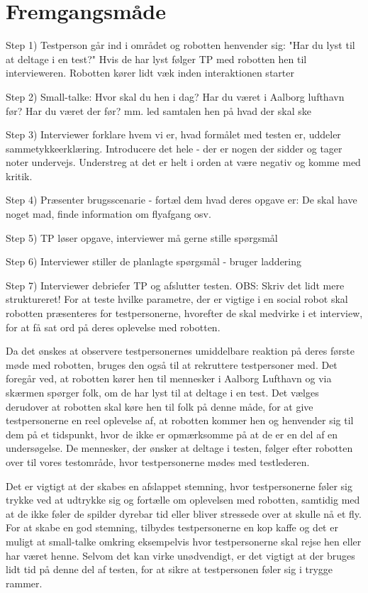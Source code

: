 \section{Fremgangsmåde}
\label{ParametreFremgangsmaade}
%
Step 1) Testperson går ind i området og robotten henvender sig: "Har du lyst til at deltage i en test?" Hvis de har lyst følger TP med robotten hen til intervieweren. Robotten kører lidt væk inden interaktionen starter

Step 2) Small-talke: Hvor skal du hen i dag? Har du været i Aalborg lufthavn før? Har du været der før? mm. led samtalen hen på hvad der skal ske

Step 3) Interviewer forklare hvem vi er, hvad formålet med testen er, uddeler sammetykkeerklæring. Introducere det hele - der er nogen der sidder og tager noter undervejs. Understreg at det er helt i orden at være negativ og komme med kritik. 

Step 4) Præsenter brugsscenarie - fortæl dem hvad deres opgave er: De skal have noget mad, finde information om flyafgang osv. 

Step 5) TP løser opgave, interviewer må gerne stille spørgsmål 

Step 6) Interviewer stiller de planlagte spørgsmål - bruger laddering

Step 7) Interviewer debriefer TP og afslutter testen. \blankline
%
OBS: Skriv det lidt mere struktureret!\blankline
%
For at teste hvilke parametre, der er vigtige i en social robot skal robotten præsenteres for testpersonerne, hvorefter de skal medvirke i et interview, for at få sat ord på deres oplevelse med robotten. 

Da det ønskes at observere testpersonernes umiddelbare reaktion på deres første møde med robotten, bruges den også til at rekruttere testpersoner med. Det foregår ved, at robotten kører hen til mennesker i Aalborg Lufthavn og via skærmen spørger folk, om de har lyst til at deltage i en test. Det vælges derudover at robotten skal køre hen til folk på denne måde, for at give testpersonerne en reel oplevelse af, at robotten kommer hen og henvender sig til dem på et tidspunkt, hvor de ikke er opmærksomme på at de er en del af en undersøgelse. De mennesker, der ønsker at deltage i testen, følger efter robotten over til vores testområde, hvor testpersonerne mødes med testlederen.\blankline

Det er vigtigt at der skabes en afslappet stemning, hvor testpersonerne føler sig trykke ved at udtrykke sig og fortælle om oplevelsen med robotten, samtidig med at de ikke føler de spilder dyrebar tid eller bliver stressede over at skulle nå et fly. For at skabe en god stemning, tilbydes testpersonerne en kop kaffe og det er muligt at small-talke omkring eksempelvis hvor testpersonerne skal rejse hen eller har været henne. Selvom det kan virke unødvendigt, er det vigtigt at der bruges lidt tid på denne del af testen, for at sikre at testpersonen føler sig i trygge rammer. 

